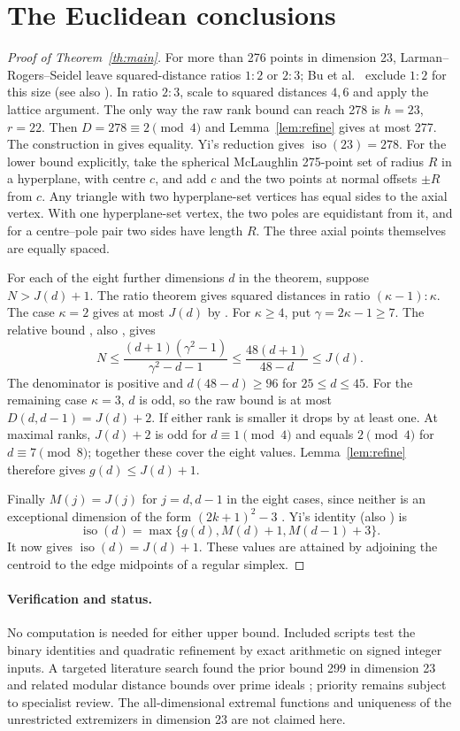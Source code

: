 \documentclass[11pt]{article}
\newcommand{\iso}{\operatorname{iso}}
\begin{document}
\section{The Euclidean conclusions}
\begin{proof}[Proof of Theorem~\ref{th:main}]
For more than 276 points in dimension 23, Larman--Rogers--Seidel \cite{lrs} leave squared-distance ratios $1:2$ or $2:3$; Bu et al.\ \cite{bu} exclude $1:2$ for this size (see also \cite[\S6]{yi}). In ratio $2:3$, scale to squared distances $4,6$ and apply the lattice argument. The only way the raw rank bound can reach 278 is $h=23$, $r=22$. Then $D=278\equiv2\pmod4$ and Lemma~\ref{lem:refine} gives at most 277. The construction in \cite{gkm} gives equality. Yi's reduction gives $\iso(23)=278$. For the lower bound explicitly, take the spherical McLaughlin 275-point set of radius $R$ in a hyperplane, with centre $c$, and add $c$ and the two points at normal offsets $\pm R$ from $c$. Any triangle with two hyperplane-set vertices has equal sides to the axial vertex. With one hyperplane-set vertex, the two poles are equidistant from it, and for a centre--pole pair two sides have length $R$. The three axial points themselves are equally spaced.

For each of the eight further dimensions $d$ in the theorem, suppose $N>J(d)+1$. The ratio theorem gives squared distances in ratio $(\kappa-1):\kappa$. The case $\kappa=2$ gives at most $J(d)$ by \cite{bu}. For $\kappa\ge4$, put $\gamma=2\kappa-1\ge7$. The relative bound \cite[Prop.~4.1]{bu}, also \cite[Lemma~8.4]{yi}, gives
\[
 N\le\frac{(d+1)(\gamma^2-1)}{\gamma^2-d-1}\le\frac{48(d+1)}{48-d}\le J(d).
\]
The denominator is positive and $d(48-d)\ge96$ for $25\le d\le45$. For the remaining case $\kappa=3$, $d$ is odd, so the raw bound is at most $D(d,d-1)=J(d)+2$. If either rank is smaller it drops by at least one. At maximal ranks, $J(d)+2$ is odd for $d\equiv1\pmod4$ and equals $2\pmod4$ for $d\equiv7\pmod8$; together these cover the eight values. Lemma~\ref{lem:refine} therefore gives $g(d)\le J(d)+1$.

Finally $M(j)=J(j)$ for $j=d,d-1$ in the eight cases, since neither is an exceptional dimension of the form $(2k+1)^2-3$ \cite{gy}. Yi's identity \cite{yi} (also \cite{cho}) is
\[
 \iso(d)=\max\{g(d),M(d)+1,M(d-1)+3\}.
\]
It now gives $\iso(d)=J(d)+1$. These values are attained by adjoining the centroid to the edge midpoints of a regular simplex.
\end{proof}

\paragraph{Verification and status.} No computation is needed for either upper bound. Included scripts test the binary identities and quadratic refinement by exact arithmetic on signed integer inputs. A targeted literature search found the prior bound 299 in dimension 23 and related modular distance bounds over prime ideals \cite{noz}; priority remains subject to specialist review. The all-dimensional extremal functions and uniqueness of the unrestricted extremizers in dimension 23 are not claimed here.
\end{document}
